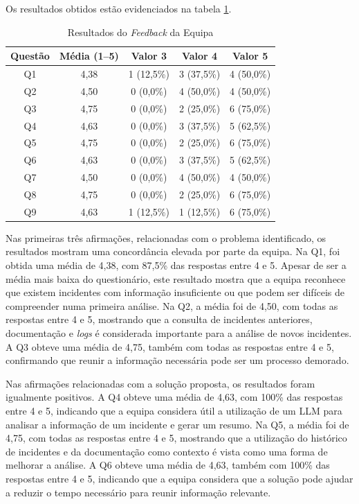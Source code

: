 		Os resultados obtidos estão evidenciados na tabela \ref{tab:resultados-feedback-equipa}.
		
		\begin{table}[H]
			\centering
			\small
			\begin{tabular}{ccccc}
				\textbf{Questão} & \textbf{Média (1--5)} & \textbf{Valor 3} & \textbf{Valor 4} & \textbf{Valor 5} \\
				\hline
				Q1 & 4,38 & 1 (12,5\%) & 3 (37,5\%) & 4 (50,0\%) \\
				\hline
				Q2 & 4,50 & 0 (0,0\%) & 4 (50,0\%) & 4 (50,0\%) \\
				\hline
				Q3 & 4,75 & 0 (0,0\%) & 2 (25,0\%) & 6 (75,0\%) \\
				\hline
				Q4 & 4,63 & 0 (0,0\%) & 3 (37,5\%) & 5 (62,5\%) \\
				\hline
				Q5 & 4,75 & 0 (0,0\%) & 2 (25,0\%) & 6 (75,0\%) \\
				\hline
				Q6 & 4,63 & 0 (0,0\%) & 3 (37,5\%) & 5 (62,5\%) \\
				\hline
				Q7 & 4,50 & 0 (0,0\%) & 4 (50,0\%) & 4 (50,0\%) \\
				\hline
				Q8 & 4,75 & 0 (0,0\%) & 2 (25,0\%) & 6 (75,0\%) \\
				\hline
				Q9 & 4,63 & 1 (12,5\%) & 1 (12,5\%) & 6 (75,0\%) \\
				\hline
			\end{tabular}
			\caption[Resultados do \textit{Feedback} da Equipa]{Resultados do \textit{Feedback} da Equipa}
			\label{tab:resultados-feedback-equipa}
		\end{table}
		
		Nas primeiras três afirmações, relacionadas com o problema identificado, os resultados mostram uma concordância elevada por parte da equipa. Na Q1, foi obtida uma média de 4,38, com 87,5\% das respostas entre 4 e 5. Apesar de ser a média mais baixa do questionário, este resultado mostra que a equipa reconhece que existem incidentes com informação insuficiente ou que podem ser difíceis de compreender numa primeira análise. Na Q2, a média foi de 4,50, com todas as respostas entre 4 e 5, mostrando que a consulta de incidentes anteriores, documentação e \textit{logs} é considerada importante para a análise de novos incidentes. A Q3 obteve uma média de 4,75, também com todas as respostas entre 4 e 5, confirmando que reunir a informação necessária pode ser um processo demorado.
		
		Nas afirmações relacionadas com a solução proposta, os resultados foram igualmente positivos. A Q4 obteve uma média de 4,63, com 100\% das respostas entre 4 e 5, indicando que a equipa considera útil a utilização de um \gls{LLM} para analisar a informação de um incidente e gerar um resumo. Na Q5, a média foi de 4,75, com todas as respostas entre 4 e 5, mostrando que a utilização do histórico de incidentes e da documentação como contexto é vista como uma forma de melhorar a análise. A Q6 obteve uma média de 4,63, também com 100\% das respostas entre 4 e 5, indicando que a equipa considera que a solução pode ajudar a reduzir o tempo necessário para reunir informação relevante.
		
